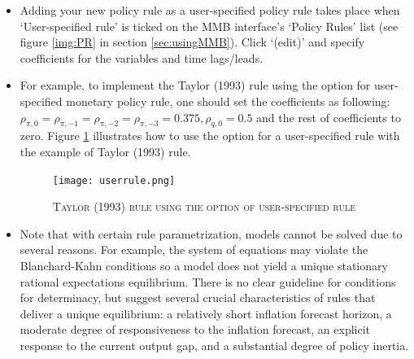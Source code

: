 \begin{itemize}
\item Adding your new policy rule as a user-specified policy rule takes place when `User-specified rule' is ticked on the MMB interface's `Policy Rules' list (see figure \ref{img:PR} in section \ref{sec:usingMMB}). Click `(edit)' and specify coefficients for the variables and time lags/leads.
\item For example, to implement the Taylor (1993) rule using the option for user-specified monetary policy rule, one should set the coefficients as following: $ \rho_{\pi,0} = \rho_{\pi,-1} = \rho_{\pi,-2} = \rho_{\pi,-3} = 0.375, \rho_{q,0} = 0.5 $ and the rest of coefficients to zero. Figure \ref{img:userruletaylor} illustrates how to use the option for a user-specified rule with the example of Taylor (1993) rule. \\

        \begin{figure}[H]
        \centering
        \caption{\textsc{Taylor (1993) rule using the option of user-specified rule }}
        \vspace{0.2cm}
        \texttt{[image: userrule.png]}
        \label{img:userruletaylor}
        \end{figure}

  \item Note that with certain rule parametrization, models cannot be solved due to several reasons. For example, the system of equations may violate the Blanchard-Kahn conditions so a model does not yield a unique stationary rational expectations equilibrium. There is no clear guideline for conditions for determinacy, but \cite{LevinWielandWilliams2003} suggest several crucial characteristics of rules that deliver a unique equilibrium: a relatively short inflation forecast horizon, a moderate degree of responsiveness to the inflation forecast, an explicit response to the current output gap, and a substantial degree of policy inertia.
\end{itemize}


